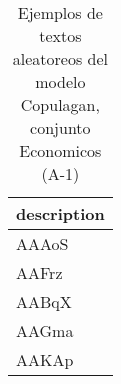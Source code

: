 \begin{table}[H]
\centering
\fontsize{8}{14}\selectfont
\caption{Ejemplos de textos aleatoreos del modelo Copulagan, conjunto Economicos (A-1)}
\label{table-sample10-economicos-a-1-copulagan-text}
\begin{tabular}{|m{50em}|}
\hline
\rowcolor[gray]{0.8}
description \\
\hline AAAoS \\
\hline AAFrz \\
\hline AABqX \\
\hline AAGma \\
\hline AAKAp \\
\hline
\end{tabular}
\end{table}

